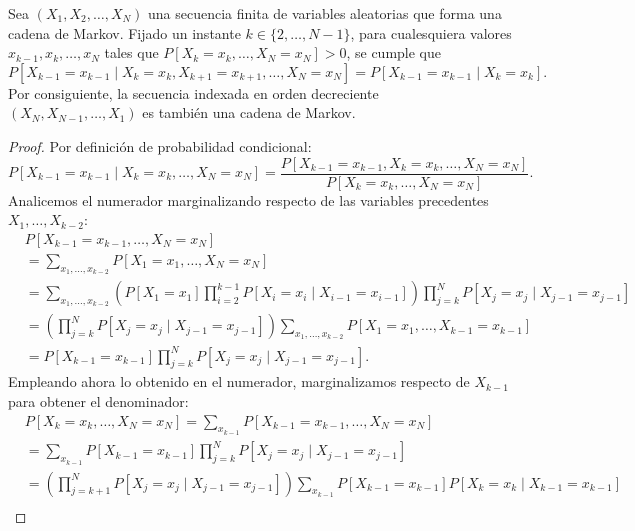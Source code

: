 \documentclass[12pt]{article}
\begin{document}
\begin{teo}
  Sea $(X_1, X_2, \ldots, X_N)$ una secuencia finita de variables aleatorias que forma una cadena de Markov. Fijado un instante $k \in \{2, \ldots, N-1\}$, para cualesquiera valores $x_{k-1}, x_k, \ldots, x_N$ tales que $P[X_k = x_k, \ldots, X_N = x_N] > 0$, se cumple que
  \begin{equation*}
  P[X_{k-1} = x_{k-1} \mid X_k = x_k, X_{k+1} = x_{k+1}, \ldots, X_N = x_N] = P[X_{k-1} = x_{k-1} \mid X_k = x_k].
  \end{equation*}
  Por consiguiente, la secuencia indexada en orden decreciente $(X_N, X_{N-1}, \ldots, X_1)$ es también una cadena de Markov.
\end{teo}
\begin{proof}
  Por definición de probabilidad condicional:
  \begin{equation*}
  P[X_{k-1} = x_{k-1} \mid X_k = x_k, \ldots, X_N = x_N] = \frac{P[X_{k-1} = x_{k-1}, X_k = x_k, \ldots, X_N = x_N]}{P[X_k = x_k, \ldots, X_N = x_N]}.
  \end{equation*}
  Analicemos el numerador marginalizando respecto de las variables precedentes $X_1, \ldots, X_{k-2}$:
  \begin{align*}
    &P[X_{k-1} = x_{k-1}, \ldots, X_N = x_N] \\
    &= \sum_{x_1, \ldots, x_{k-2}} P[X_1 = x_1, \ldots, X_N = x_N] \\
    &= \sum_{x_1, \ldots, x_{k-2}} \left( P[X_1 = x_1] \prod_{i=2}^{k-1} P[X_i = x_i \mid X_{i-1} = x_{i-1}] \right) \prod_{j=k}^{N} P[X_j = x_j \mid X_{j-1} = x_{j-1}] \\
    &= \left( \prod_{j=k}^{N} P[X_j = x_j \mid X_{j-1} = x_{j-1}] \right) \sum_{x_1, \ldots, x_{k-2}} P[X_1 = x_1, \ldots, X_{k-1} = x_{k-1}] \\
    &= P[X_{k-1} = x_{k-1}] \prod_{j=k}^{N} P[X_j = x_j \mid X_{j-1} = x_{j-1}].
  \end{align*}
  Empleando ahora lo obtenido en el numerador, marginalizamos respecto de $X_{k-1}$ para obtener el denominador:
  \begin{align*}
    &P[X_k = x_k, \ldots, X_N = x_N]
    = \sum_{x_{k-1}} P[X_{k-1} = x_{k-1}, \ldots, X_N = x_N] \\
    &= \sum_{x_{k-1}} P[X_{k-1} = x_{k-1}] \prod_{j=k}^{N} P[X_j = x_j \mid X_{j-1} = x_{j-1}] \\
    &= \left( \prod_{j=k+1}^{N} P[X_j = x_j \mid X_{j-1} = x_{j-1}] \right) \sum_{x_{k-1}} P[X_{k-1} = x_{k-1}] P[X_k = x_k \mid X_{k-1} = x_{k-1}] \\

\end{align*}
\end{proof}
\end{document}
